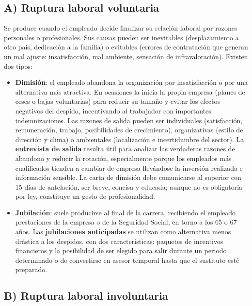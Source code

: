 \documentclass[12pt]{book} %
\providecommand{\tightlist}{%
  \setlength{\itemsep}{0pt}\setlength{\parskip}{0pt}}
\begin{document}
\hypertarget{a-ruptura-laboral-voluntaria}{%
\subsection{A) Ruptura laboral
voluntaria}\label{a-ruptura-laboral-voluntaria}}

Se produce cuando el empleado decide finalizar su relación laboral por
razones personales o profesionales. Sus causas pueden ser inevitables
(desplazamiento a otro país, dedicación a la familia) o evitables
(errores de contratación que generan un mal ajuste: insatisfacción, mal
ambiente, sensación de infravaloración). Existen dos tipos:

\begin{itemize}
\tightlist
\item
  \textbf{Dimisión}: el empleado abandona la organización por
  insatisfacción o por una alternativa más atractiva. En ocasiones la
  inicia la propia empresa (planes de ceses o bajas voluntarias) para
  reducir su tamaño y evitar los efectos negativos del despido,
  incentivando al trabajador con importantes indemnizaciones. Las
  razones de salida pueden ser individuales (satisfacción, remuneración,
  trabajo, posibilidades de crecimiento), organizativas (estilo de
  dirección y clima) o ambientales (localización e incertidumbre del
  sector). La \textbf{entrevista de salida} resulta útil para analizar
  las verdaderas razones de abandono y reducir la rotación,
  especialmente porque los empleados más cualificados tienden a cambiar
  de empresa llevándose la inversión realizada e información sensible.
  La carta de dimisión debe comunicarse al superior con 15 días de
  antelación, ser breve, concisa y educada; aunque no es obligatoria por
  ley, constituye un gesto de profesionalidad.
\item
  \textbf{Jubilación}: suele producirse al final de la carrera,
  recibiendo el empleado prestaciones de la empresa o de la Seguridad
  Social, en torno a los 65 o 67 años. Las \textbf{jubilaciones
  anticipadas} se utilizan como alternativa menos drástica a los
  despidos, con dos características: paquetes de incentivos financieros
  y la posibilidad de ser elegido para salir durante un periodo
  determinado o de convertirse en asesor temporal hasta que el sustituto
  esté preparado.
\end{itemize}

\hypertarget{b-ruptura-laboral-involuntaria}{%
\subsection{B) Ruptura laboral
involuntaria}\label{b-ruptura-laboral-involuntaria}}
\end{document}
